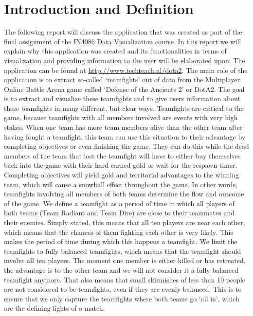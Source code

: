 \documentclass[11pt,twoside,a4paper]{article}
\begin{document}
\section*{Introduction and Definition}
The following report will discuss the application that was created as part of the final assignment of the IN4086 Data Visualization course. In this report we will explain why this application was created and its functionalities in terms of visualization and providing information to the user will be elaborated upon. The application can be found at \url{http://www.techteach.nl/dota2}.
\newline\newline
The main role of the application is to extract so-called `teamfights' out of data from the Multiplayer Online Battle Arena game called `Defense of the Ancients 2' or DotA2. The goal is to extract and visualize these teamfights and to give users information about these teamfights in many different, but clear ways.
\newline\newline
Teamfights are critical to the game, because teamfights with all members involved are events with very high stakes. When one team has more team members alive than the other team after having fought a teamfight, this team can use this situation to their advantage by completing objectives or even finishing the game. They can do this while the dead members of the team that lost the teamfight will have to either buy themselves back into the game with their hard earned gold or wait for the respawn timer. Completing objectives will yield gold and territorial advantages to the winning team, which will cause a snowball effect throughout the game. In other words, teamfights involving all members of both teams determine the flow and outcome of the game.
\newline\newline
We define a teamfight as a period of time in which all players of both teams (Team Radiant and Team Dire) are close to their teammates and their enemies. Simply stated, this means that all ten players are near each other, which means that the chances of them fighting each other is very likely. This makes the period of time during which this happens a teamfight. We limit the teamfights to fully balanced teamfights, which means that the teamfight should involve all ten players. The moment one member is either killed or has retreated, the advantage is to the other team and we will not consider it a fully balanced teamfight anymore. That also means that small skirmishes of less than 10 people are not considered to be teamfights, even if they are evenly balanced. This is to ensure that we only capture the teamfights where both teams go `all in', which are the defining fights of a match.
\newpage
\end{document}
